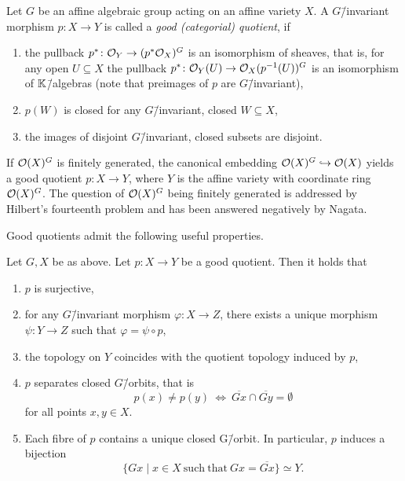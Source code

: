 \begin{defi}
	Let $G$ be an affine algebraic group acting on an affine variety $X$. A $G$\=/invariant morphism $p\colon X \rightarrow Y$ is called a \emph{good (categorial) quotient}, if
	\begin{enumerate}[label={\upshape(\roman*)}]
		\item the pullback $p^*\colon \mathcal{O}_Y \rightarrow (p^*\mathcal{O}_X)^G$ is an isomorphism of sheaves, that is, for any open $U\subseteq X$ the pullback $p^*\colon \mathcal{O}_Y(U) \rightarrow \mathcal{O}_X(p^{-1}(U))^G$ is an isomorphism of $\mathbb{K}$\=/algebras (note that preimages of $p$ are $G$\=/invariant),
		\item $p(W)$ is closed for any $G$\=/invariant, closed $W\subseteq X$,
		\item the images of disjoint $G$\=/invariant, closed subsets are disjoint.
	\end{enumerate}
\end{defi}

If $\mathcal{O}(X)^G$ is finitely generated, the canonical embedding $\mathcal{O}(X)^G \hookrightarrow \mathcal{O}(X)$ yields a good quotient $p\colon X \rightarrow Y$, where $Y$ is the affine variety with coordinate ring $\mathcal{O}(X)^G$. The question of $\mathcal{O}(X)^G$ being finitely generated is addressed by Hilbert's fourteenth problem and has been answered negatively by Nagata. \cite[chapter 4]{lectures_invariant_theory}

Good quotients admit the following useful properties.

\begin{prop}
	\label{prop:good_quotient_properties}
	Let $G, X$ be as above. Let $p\colon X \rightarrow Y$ be a good quotient. Then it holds that
	\begin{enumerate}[label={\upshape(\roman*)}]
		\item $p$ is surjective,
		\item for any $G$\=/invariant morphism $\varphi\colon X \rightarrow Z$, there exists a unique morphism $\psi\colon Y \rightarrow Z$ such that $\varphi = \psi \circ p$,
		\label{enum_item:good_quotient_universal_property}
		\item the topology on $Y$ coincides with the quotient topology induced by $p$,
		\item $p$ separates closed $G$\=/orbits, that is
		$$p(x) \neq p(y)\ \Leftrightarrow\ \overline{Gx}\cap\overline{Gy} = \emptyset$$
		for all points $x,y\in X$.
		\item Each fibre of $p$ contains a unique closed G\=/orbit. In particular, $p$ induces a bijection
		$$\{Gx\mid x\in X\ \mathrm{such}\ \mathrm{that}\ Gx = \overline{Gx}\}\simeq Y.$$
		\label{enum_item:good_quotient_space_bijection_closed_orbits}
	\end{enumerate}
\end{prop}


